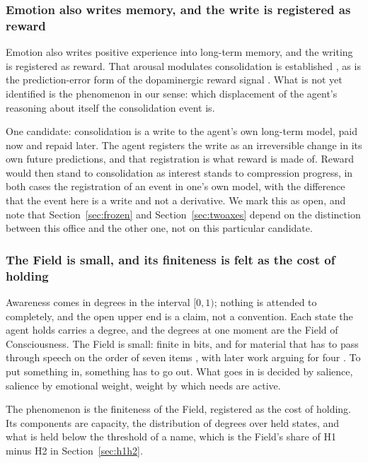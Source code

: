 \subsubsection{Emotion also writes memory, and the write is registered as reward}
\label{sec:consolidation}

Emotion also writes positive experience into long-term memory, and the writing is registered as reward.
That arousal modulates consolidation is established \citep{cahill1998,mcgaugh2000}, as is the
prediction-error form of the dopaminergic reward signal \citep{schultz1997}. What is not yet identified
is the phenomenon in our sense: which displacement of the agent's reasoning about itself the
consolidation event is.

One candidate: consolidation is a write to the agent's own long-term model, paid now and repaid later. The
agent registers the write as an irreversible change in its own future predictions, and that registration
is what reward is made of. Reward would then stand to consolidation as interest stands to compression
progress, in both cases the registration of an event in one's own model, with the difference that the
event here is a write and not a derivative. We mark this as open, and note that Section~\ref{sec:frozen} and Section~\ref{sec:twoaxes} depend on
the distinction between this office and the other one, not on this particular candidate.

\subsubsection{The Field is small, and its finiteness is felt as the cost of holding}
\label{sec:field}

Awareness comes in degrees in the interval $[0,1)$; nothing is attended to completely, and the open
upper end is a claim, not a convention. Each state the agent holds carries a degree, and the degrees at
one moment are the Field of Consciousness. The Field is small: finite in bits, and for material that has
to pass through speech on the order of seven items \citep{miller1956}, with later work arguing for four
\citep{cowan2001}. To put something in, something has to go out. What goes in is decided by salience,
salience by emotional weight, weight by which needs are active.

The phenomenon is the finiteness of the Field, registered as the cost of holding. Its components are
capacity, the distribution of degrees over held states, and what is held below the threshold of a name,
which is the Field's share of H1 minus H2 in Section~\ref{sec:h1h2}.


